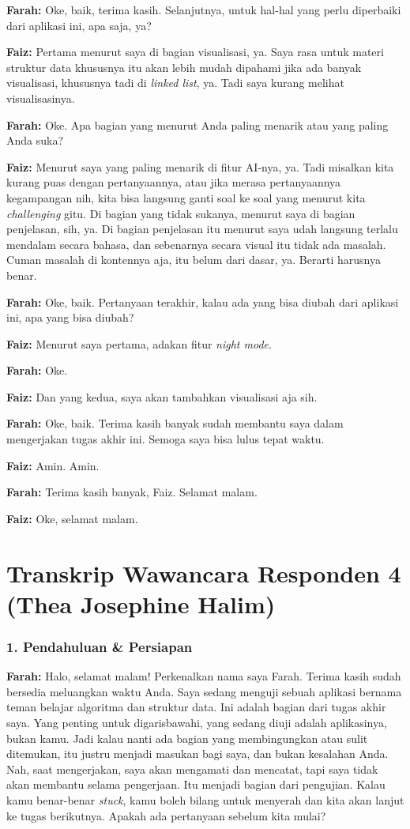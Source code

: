 \textbf{Farah:} Oke, baik, terima kasih. Selanjutnya, untuk hal-hal yang perlu diperbaiki dari aplikasi ini, apa saja, ya?

\textbf{Faiz:} Pertama menurut saya di bagian visualisasi, ya. Saya rasa untuk materi struktur data khususnya itu akan lebih mudah dipahami jika ada banyak visualisasi, khususnya tadi di \textit{linked list}, ya. Tadi saya kurang melihat visualisasinya.

\textbf{Farah:} Oke. Apa bagian yang menurut Anda paling menarik atau yang paling Anda suka?

\textbf{Faiz:} Menurut saya yang paling menarik di fitur AI-nya, ya. Tadi misalkan kita kurang puas dengan pertanyaannya, atau jika merasa pertanyaannya kegampangan nih, kita bisa langsung ganti soal ke soal yang menurut kita \textit{challenging} gitu. Di bagian yang tidak sukanya, menurut saya di bagian penjelasan, sih, ya. Di bagian penjelasan itu menurut saya udah langsung terlalu mendalam secara bahasa, dan sebenarnya secara visual itu tidak ada masalah. Cuman masalah di kontennya aja, itu belum dari dasar, ya. Berarti harusnya benar.

\textbf{Farah:} Oke, baik. Pertanyaan terakhir, kalau ada yang bisa diubah dari aplikasi ini, apa yang bisa diubah?

\textbf{Faiz:} Menurut saya pertama, adakan fitur \textit{night mode}.

\textbf{Farah:} Oke.

\textbf{Faiz:} Dan yang kedua, saya akan tambahkan visualisasi aja sih.

\textbf{Farah:} Oke, baik. Terima kasih banyak sudah membantu saya dalam mengerjakan tugas akhir ini. Semoga saya bisa lulus tepat waktu.

\textbf{Faiz:} Amin. Amin.

\textbf{Farah:} Terima kasih banyak, Faiz. Selamat malam.

\textbf{Faiz:} Oke, selamat malam.

\section{Transkrip Wawancara Responden 4 (Thea Josephine Halim)}

\subsubsection*{1. Pendahuluan \& Persiapan}

\textbf{Farah:} Halo, selamat malam! Perkenalkan nama saya Farah. Terima kasih sudah bersedia meluangkan waktu Anda. Saya sedang menguji sebuah aplikasi bernama teman belajar algoritma dan struktur data. Ini adalah bagian dari tugas akhir saya. Yang penting untuk digarisbawahi, yang sedang diuji adalah aplikasinya, bukan kamu. Jadi kalau nanti ada bagian yang membingungkan atau sulit ditemukan, itu justru menjadi masukan bagi saya, dan bukan kesalahan Anda. Nah, saat mengerjakan, saya akan mengamati dan mencatat, tapi saya tidak akan membantu selama pengerjaan. Itu menjadi bagian dari pengujian. Kalau kamu benar-benar \textit{stuck}, kamu boleh bilang untuk menyerah dan kita akan lanjut ke tugas berikutnya. Apakah ada pertanyaan sebelum kita mulai?

